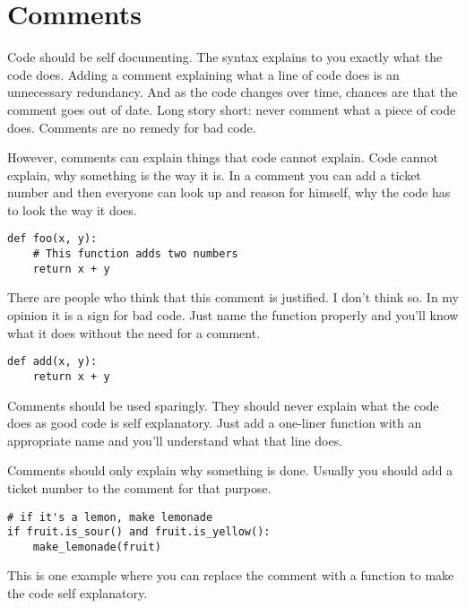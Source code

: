 \section{Comments}

Code should be self documenting. The syntax explains to you exactly what the code does. Adding a comment explaining what a line of code does is an unnecessary redundancy. And as the code changes over time, chances are that the comment goes out of date. Long story short: never comment what a piece of code does. Comments are no remedy for bad code.

However, comments can explain things that code cannot explain. Code cannot explain, why something is the way it is. In a comment you can add a ticket number and then everyone can look up and reason for himself, why the code has to look the way it does.

\begin{programcode}{}
\begin{verbatim}
def foo(x, y):
    # This function adds two numbers
    return x + y
\end{verbatim}
\end{programcode}

There are people who think that this comment is justified. I don't think so. In my opinion it is a sign for bad code. Just name the function properly and you'll know what it does without the need for a comment.

\begin{programcode}{}
\begin{verbatim}
def add(x, y):
    return x + y
\end{verbatim}
\end{programcode}
    
Comments should be used sparingly. They should never explain what the code does as good code is self explanatory. Just add a one-liner function with an appropriate name and you'll understand what that line does.

Comments should only explain why something is done. Usually you should add a ticket number to the comment for that purpose.

\begin{programcode}{}
\begin{verbatim}
# if it's a lemon, make lemonade
if fruit.is_sour() and fruit.is_yellow():
    make_lemonade(fruit)
\end{verbatim}
\end{programcode}

This is one example where you can replace the comment with a function to make the code self explanatory.

